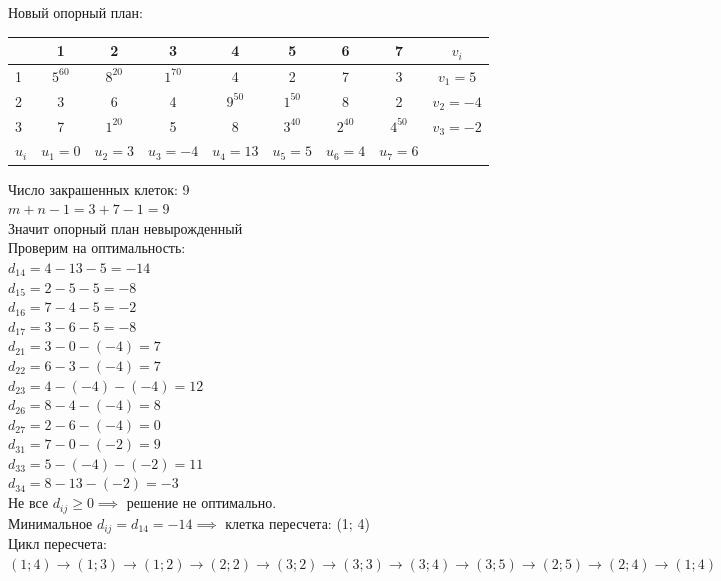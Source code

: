Новый опорный план:
\begin{center}
    \begin{tabular}{|a | c | c | c | c | c | c | c | c|} 
         \hline
            & 1 & 2 & 3 & 4 & 5 & 6 & 7 & $v_{i}$\\
          &  $5^{60}$ &  $8^{20}$ &  $1^{70}$ & 4 & 2 & 7 & 3 & $v_1 = 5$\\
          & 3 & 6 & 4 &  $9^{50}$ &  $1^{50}$ & 8 & 2 & $v_2 = -4$\\
          & 7 &  $1^{20}$ & 5 & 8 &  $3^{40}$ &  $2^{40}$ &  $4^{50}$ & $v_3 = -2$\\
         \hline
            $u_{i}$ & $u_1 = 0$ & $u_2 = 3$ & $u_3 = -4$ & $u_4 = 13$ & $u_5 = 5$ & $u_6 = 4$ & $u_7 = 6$ & \\
        \hline
    \end{tabular}
\end{center}

\begin{flushleft}
Число закрашенных клеток: 9\\
$m + n - 1 = 3 + 7 - 1 = 9$\\
Значит опорный план невырожденный\\
Проверим на оптимальность:\\
$d_{14} = 4 - 13 - 5 = -14$\\
$d_{15} = 2 - 5 - 5 = -8$\\
$d_{16} = 7 - 4 - 5 = -2$\\
$d_{17} = 3 - 6 - 5 = -8$\\
$d_{21} = 3 - 0 - (-4) = 7$\\
$d_{22} = 6 - 3 - (-4) = 7$\\
$d_{23} = 4 - (-4) - (-4) = 12$\\
$d_{26} = 8 - 4 - (-4) = 8$\\
$d_{27} = 2 - 6 - (-4) = 0$\\
$d_{31} = 7 - 0 - (-2) = 9$\\
$d_{33} = 5 - (-4) - (-2) = 11$\\
$d_{34} = 8 - 13 - (-2) = -3$\\
Не все $d_{ij} \ge 0 \implies$ решение не оптимально.\\
Минимальное $d_{ij} = d_{14} = -14 \implies$ клетка пересчета: (1; 4)\\
Цикл пересчета:\\
$(1; 4) \rightarrow (1; 3) \rightarrow (1; 2) \rightarrow (2; 2) \rightarrow (3; 2) \rightarrow (3; 3) \rightarrow (3; 4) \rightarrow (3; 5) \rightarrow (2; 5) \rightarrow (2; 4) \rightarrow (1; 4)$
\end{flushleft}

